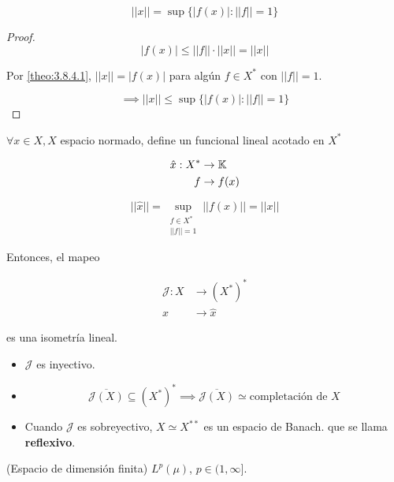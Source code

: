 \begin{fcorollary}
    \[||x||=\sup\{|f(x)|:||f||=1\}\]
\end{fcorollary}

\begin{proof}
    \[|f(x)|\leq ||f||\cdot ||x||=||x||\]

    Por \ref{theo:3.8.4.1}, $||x||=|f(x)|$ para algún $f\in X^*$ con $||f||=1$.

    \[\implies ||x||\leq \sup\{|f(x)|:||f||=1\}\]
\end{proof}

\begin{ftheorem}
    $\forall x\in X, X$ espacio normado, define un funcional lineal acotado en $X^*$

    \begin{align*}
        \hat x:X^*&\to\mathbb{K}\\
        f&\to f(x)
    \end{align*}

    \[||\hat x||=\sup_{\substack{f\in X^*\\ ||f||=1}}||f(x)||=||x||\]

    Entonces, el mapeo 

    \begin{align*}
        \mathcal{J}:X&\to (X^*)^*\\
        x&\to \hat x
    \end{align*}

    es una isometría lineal.
\end{ftheorem}

 \begin{fnote}\hfill
    \begin{itemize}
        \item $\mathcal{J}$ es inyectivo.

        \item \[\overline{\mathcal{J}(X)}\subseteq (X^*)^*\implies \overline{\mathcal{J}(X)}\simeq \text{completación de }X\]

        \item Cuando $\mathcal{J}$ es sobreyectivo, $X\simeq X^{**}$ es un espacio de Banach. que se llama \textbf{reflexivo}.
    \end{itemize}
 \end{fnote}

 \begin{fexample}
    (Espacio de dimensión finita) $L^p(\mu)$, $p\in (1,\infty]$.
 \end{fexample}

